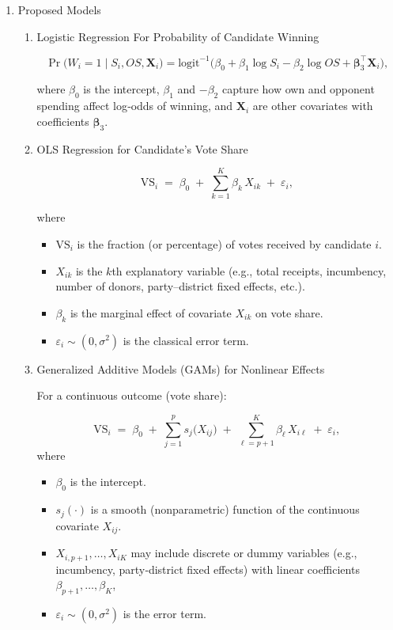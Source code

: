\documentclass[12pt]{article}
\begin{document}
\begin{enumerate}[label=\Alph*.]
    \item Proposed Models
    \begin{enumerate}[label=\arabic*)]
        \item Logistic Regression For Probability of Candidate Winning

\[
\Pr\bigl(W_{i}=1 \mid S_{i},OS,\mathbf{X}_{i}\bigr)
=\text{logit}^{-1}\bigl(\beta_{0}+\beta_{1}\log S_{i}-\beta_{2}\log OS+\boldsymbol{\beta}_{3}^{\top}\mathbf{X}_{i}\bigr),
\]

where $\beta_{0}$ is the intercept, $\beta_{1}$ and $-\beta_{2}$ capture how own and opponent spending affect log‐odds of winning, and $\mathbf{X}_i$ are other covariates with coefficients $\boldsymbol{\beta}_{3}$.

        \item OLS Regression for Candidate's Vote Share

\[
\mathrm{VS}_i \;=\; \beta_{0} \;+\; \sum_{k=1}^{K} \beta_{k}\,X_{ik} \;+\; \varepsilon_i,
\]

where
\begin{itemize}[itemsep=0.5ex]
  \item $\mathrm{VS}_i$ is the fraction (or percentage) of votes received by candidate \(i\). 
  \item $X_{ik}$ is the \(k\)th explanatory variable (e.g., total receipts, incumbency, number of donors, party–district fixed effects, etc.).
  \item $\beta_{k}$ is the marginal effect of covariate \(X_{ik}\) on vote share.
  \item $\varepsilon_i \sim (0,\sigma^2)$ is the classical error term.
\end{itemize}


        \item Generalized Additive Models (GAMs) for Nonlinear Effects

For a continuous outcome (vote share): 
        
\[
\mathrm{VS}_i 
\;=\; 
\beta_{0} \;+\; \sum_{j=1}^{p} s_{j}\bigl(X_{ij}\bigr) \;+\; \sum_{\ell=p+1}^{K} \beta_{\ell}\,X_{i\ell} \;+\; \varepsilon_i,
\]
where
\begin{itemize}[itemsep=0.5ex]
  \item $\beta_{0}$ is the intercept.
  \item $s_{j}(\cdot)$ is a smooth (nonparametric) function of the continuous covariate \(X_{ij}\).
  \item $X_{i,p+1},\dots,X_{iK}$ may include discrete or dummy variables (e.g., incumbency, party‐district fixed effects) with linear coefficients \(\beta_{p+1},\dots,\beta_{K}\),
  \item $\varepsilon_i \sim (0,\sigma^2)$ is the error term.
\end{itemize}


\end{enumerate}
\end{enumerate}
\end{document}
